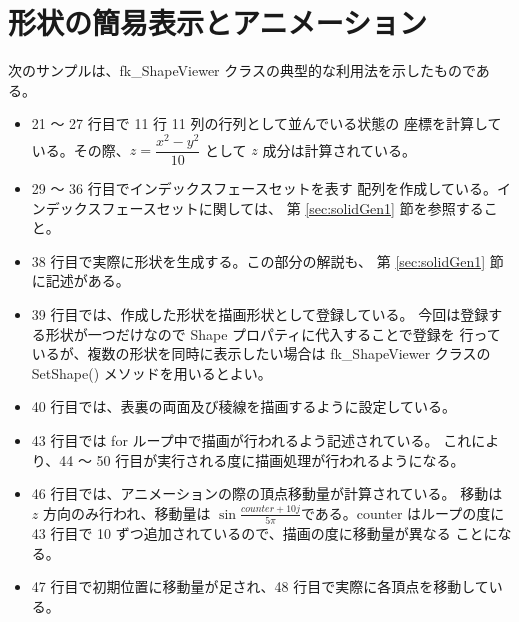 \section{形状の簡易表示とアニメーション} \label{sec:sampleviewer}

次のサンプルは、fk\_ShapeViewer クラスの典型的な利用法を示したものである。

\begin{itemize}
 \item 21 〜 27 行目で 11 行 11 列の行列として並んでいる状態の
	座標を計算している。その際、\(z = \dfrac{x^2 - y^2}{10}\)
	として \(z\) 成分は計算されている。

 \item 29 〜 36 行目でインデックスフェースセットを表す
	配列を作成している。インデックスフェースセットに関しては、
	第 \ref{sec:solidGen1} 節を参照すること。

 \item 38 行目で実際に形状を生成する。この部分の解説も、
	第 \ref{sec:solidGen1} 節に記述がある。

 \item 39 行目では、作成した形状を描画形状として登録している。
	今回は登録する形状が一つだけなので Shape プロパティに代入することで登録を
	行っているが、複数の形状を同時に表示したい場合は fk\_ShapeViewer クラスの
	SetShape() メソッドを用いるとよい。

 \item 40 行目では、表裏の両面及び稜線を描画するように設定している。

 \item 43 行目では for ループ中で描画が行われるよう記述されている。
	これにより、44 〜 50 行目が実行される度に描画処理が行われるようになる。

 \item 46 行目では、アニメーションの際の頂点移動量が計算されている。
	移動は \(z\) 方向のみ行われ、移動量は
	\(\sin\frac{counter + 10j}{5\pi}\)である。counter はループの度に
	43 行目で 10 ずつ追加されているので、描画の度に移動量が異なる
	ことになる。

 \item 47 行目で初期位置に移動量が足され、48 行目で実際に各頂点を移動している。
\end{itemize}

